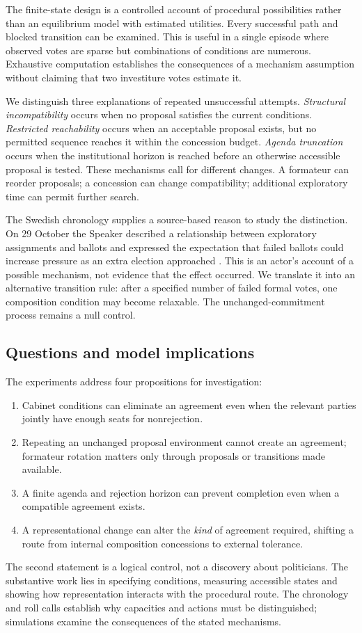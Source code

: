 \documentclass[11pt,a4paper]{article}
\begin{document}
The finite-state design is a controlled account of procedural possibilities rather than an equilibrium model with estimated utilities. Every successful path and blocked transition can be examined. This is useful in a single episode where observed votes are sparse but combinations of conditions are numerous. Exhaustive computation establishes the consequences of a mechanism assumption without claiming that two investiture votes estimate it.

We distinguish three explanations of repeated unsuccessful attempts. \emph{Structural incompatibility} occurs when no proposal satisfies the current conditions. \emph{Restricted reachability} occurs when an acceptable proposal exists, but no permitted sequence reaches it within the concession budget. \emph{Agenda truncation} occurs when the institutional horizon is reached before an otherwise accessible proposal is tested. These mechanisms call for different changes. A formateur can reorder proposals; a concession can change compatibility; additional exploratory time can permit further search.

The Swedish chronology supplies a source-based reason to study the distinction. On 29 October the Speaker described a relationship between exploratory assignments and ballots and expressed the expectation that failed ballots could increase pressure as an extra election approached \citep{riksdag29oct}. This is an actor's account of a possible mechanism, not evidence that the effect occurred. We translate it into an alternative transition rule: after a specified number of failed formal votes, one composition condition may become relaxable. The unchanged-commitment process remains a null control.

\subsection{Questions and model implications}

The experiments address four propositions for investigation:
\begin{enumerate}
\item Cabinet conditions can eliminate an agreement even when the relevant parties jointly have enough seats for nonrejection.
\item Repeating an unchanged proposal environment cannot create an agreement; formateur rotation matters only through proposals or transitions made available.
\item A finite agenda and rejection horizon can prevent completion even when a compatible agreement exists.
\item A representational change can alter the \emph{kind} of agreement required, shifting a route from internal composition concessions to external tolerance.
\end{enumerate}
The second statement is a logical control, not a discovery about politicians. The substantive work lies in specifying conditions, measuring accessible states and showing how representation interacts with the procedural route. The chronology and roll calls establish why capacities and actions must be distinguished; simulations examine the consequences of the stated mechanisms.
\end{document}
